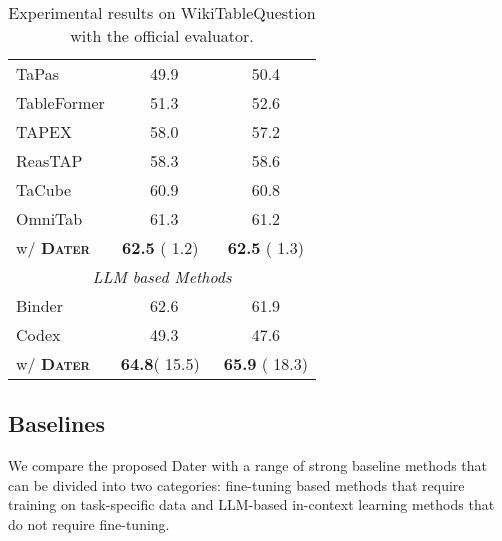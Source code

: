 \documentclass{article}
\begin{document}
\begin{table}
\begin{minipage}[t]{0.5\linewidth}
\begin{tabular}{lcc}
    TaPas  & 49.9 & 50.4 \\
    TableFormer & 51.3 & 52.6 \\
    TAPEX  & 58.0 & 57.2 \\
    ReasTAP & 58.3 & 58.6\\
    TaCube  & 60.9 & 60.8 \\
    OmniTab &  61.3 & 61.2 \\
    \rowcolor[RGB]{237,237,237} \quad w/ \textbf{\textsc{Dater}} & \textbf{62.5} ( 1.2)\ & \textbf{62.5} ( 1.3)\\
    \midrule
        \multicolumn{3}{c}{\textit{  LLM based Methods}} \\
    Binder & 62.6 & 61.9 \\
    Codex  & 49.3 & 47.6 \\
    \rowcolor[RGB]{237,237,237} \quad w/ \textbf{\textsc{Dater}} & \textbf{64.8}( 15.5)\  & \textbf{65.9} ( 18.3) \\
    \bottomrule
  \end{tabular}
  \vspace{0.2cm}
  \caption{
  Experimental results on WikiTableQuestion with the official evaluator. 
  }
  \label{tab:wikitq}
\end{minipage}
\end{table}


\subsection{Baselines}
We compare the proposed Dater with a range of strong baseline methods that can be divided into two categories: fine-tuning based methods that require training on task-specific data and LLM-based in-context learning methods that do not require fine-tuning.
\end{document}
